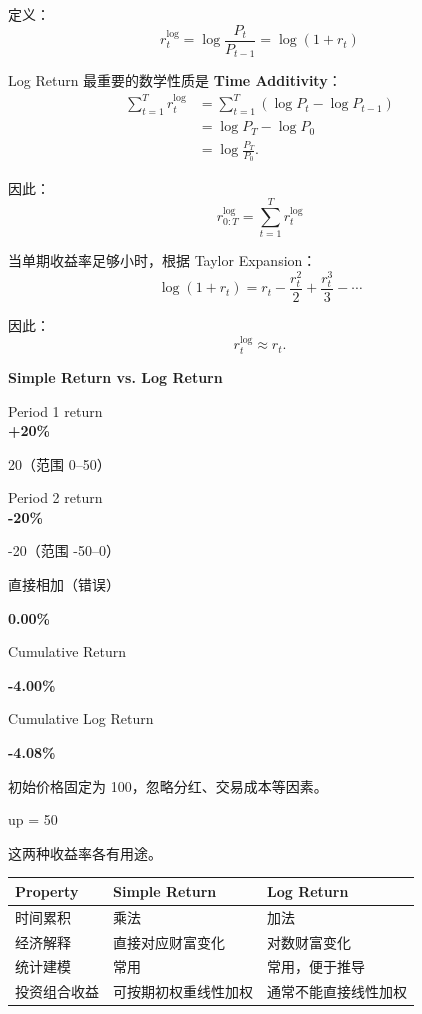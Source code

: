 定义：
\[\boxed{
r_t^{\log}
=
\log\frac{P_t}{P_{t-1}}
=
\log(1+r_t)
}\]

Log Return 最重要的数学性质是 \textbf{Time Additivity}：
\[\begin{aligned}
\sum_{t=1}^{T}r_t^{\log}
&=
\sum_{t=1}^{T}
(\log P_t-\log P_{t-1})\\
&=\log P_T-\log P_0\\
&=\log\frac{P_T}{P_0}.
\end{aligned}\]

因此：
\[\boxed{
r_{0:T}^{\log}
=
\sum_{t=1}^{T}r_t^{\log}
}\]

当单期收益率足够小时，根据 Taylor Expansion：
\[\log(1+r_t)
=
r_t-\frac{r_t^2}{2}
+\frac{r_t^3}{3}-\cdots\]

因此：
\[r_t^{\log}\approx r_t.\]

\textbf{Simple Return vs. Log Return}

Period 1 return\\
\textbf{+20\%}

20（范围 0--50）

Period 2 return\\
\textbf{-20\%}

-20（范围 -50--0）


直接相加（错误）

\textbf{0.00\%}

Cumulative Return

\textbf{-4.00\%}

Cumulative Log Return

\textbf{-4.08\%}

初始价格固定为 100，忽略分红、交易成本等因素。

up = 50


这两种收益率各有用途。

\begin{readertable}
\begin{longtable}[]{@{}
  >{\raggedright\arraybackslash}p{}
  >{\raggedright\arraybackslash}p{}
  >{\raggedright\arraybackslash}p{}@{}}
\toprule
Property & Simple Return & Log Return \\
\midrule
\endhead
时间累积 & 乘法 & 加法 \\
经济解释 & 直接对应财富变化 & 对数财富变化 \\
统计建模 & 常用 & 常用，便于推导 \\
投资组合收益 & 可按期初权重线性加权 & 通常不能直接线性加权 \\
\bottomrule
\end{longtable}
\end{readertable}

